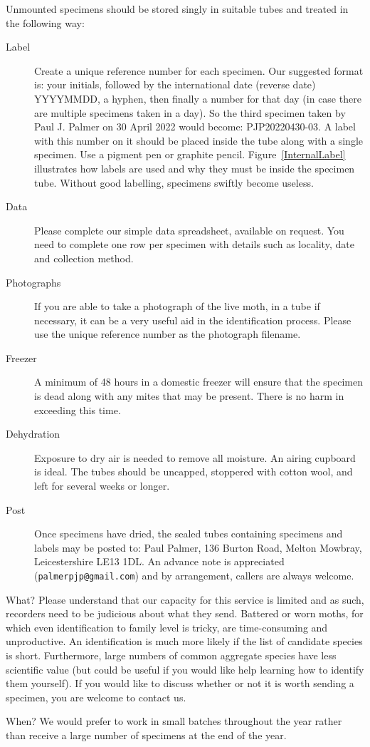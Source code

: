 \documentclass[10pt]{article}
\begin{document}
Unmounted specimens should be stored singly in suitable tubes and treated in the following way:
\begin{description}

	\item[Label] Create a unique reference number for each specimen. Our suggested format is: your initials, followed by the international date (reverse date) YYYYMMDD, a hyphen, then finally a number for that day (in case there are multiple specimens taken in a day). So the third specimen taken by Paul J. Palmer on 30 April 2022 would become: PJP20220430-03. A label with this number on it should be placed inside the tube along with a single specimen. Use a pigment pen or graphite pencil. Figure~\ref{InternalLabel} illustrates how labels are used and why they must be inside the specimen tube. Without good labelling, specimens swiftly become useless. 
	\item[Data] Please complete our simple data spreadsheet, available on request. You need to complete one row per specimen with details such as locality, date and collection method. 
	\item[Photographs] If you are able to take a photograph of the live moth, in a tube if necessary, it can be a very useful aid in the identification process. Please use the unique reference number as the photograph filename.
	\item[Freezer] A minimum of 48 hours in a domestic freezer will ensure that the specimen is dead along with any mites that may be present. There is no harm in exceeding this time.
	\item[Dehydration] Exposure to dry air is needed to remove all moisture. An airing cupboard is ideal. The tubes should be uncapped, stoppered with cotton wool, and left for several weeks or longer. 
	\item[Post] Once specimens have dried, the sealed tubes containing specimens and labels may be posted to: Paul Palmer, 136 Burton Road, Melton Mowbray, Leicestershire LE13 1DL. An advance note is appreciated \\ (\texttt{palmerpjp@gmail.com}) and by arrangement, callers are always welcome.
\end{description}
	\item[What?] Please understand that our capacity for this service is limited and as such, recorders need to be judicious about what they send. Battered or worn moths, for which even identification to family level is tricky, are time-consuming and unproductive. An identification is much more likely if the list of candidate species is short. Furthermore, large numbers of common aggregate species have less scientific value (but could be useful if you would like help learning how to identify them yourself). If you would like to discuss whether or not it is worth sending a specimen, you are welcome to contact us.  
	\item[When?] We would prefer to work in small batches throughout the year rather than receive a large number of specimens at the end of the year. 
\end{document}

